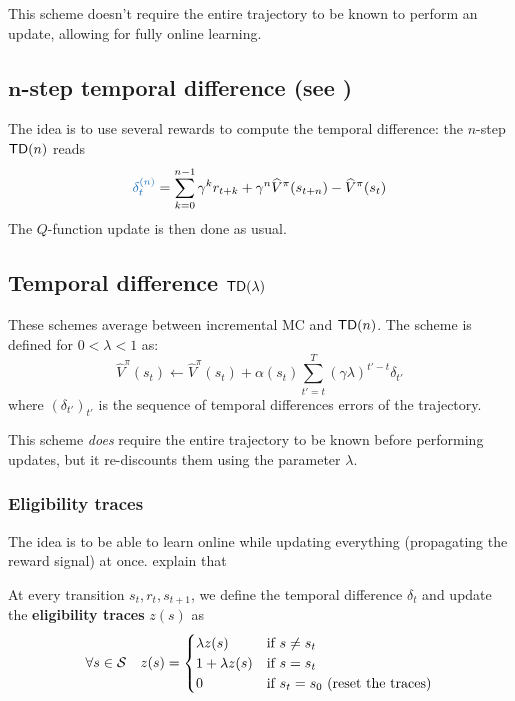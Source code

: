 \documentclass[../course-notes.tex]{subfiles}
\begin{document}
This scheme doesn't require the entire trajectory to be known to perform an update, allowing for fully online learning.


\subsection{$\boldsymbol{n}$-step temporal difference (see \cite[chap.~7]{Sutton1998})}

The idea is to use several rewards to compute the temporal difference: the $n$-step $\mathsf{TD}(n)$ reads
\begin{equation}
	{\bluefont \delta^{(n)}_t} =
	\sum_{k=0}^{n-1} \gamma^k r_{t+k}
	+ \gamma^n \widehat{V}^\pi(s_{t+n}) - \widehat{V}^\pi(s_t)
\end{equation}
The $Q$-function update is then done as usual.



\subsection{Temporal difference $\mathsf{TD}(\lambda)$}

These schemes average between incremental MC and $\mathsf{TD}(n)$. The scheme is defined for $0 < \lambda < 1$ as:
\begin{equation}
	\widehat{V}^\pi(s_t) \leftarrow \widehat{V}^\pi(s_t) + \alpha(s_t) \sum_{t'=t}^T (\gamma\lambda)^{t'-t}\delta_{t'}
\end{equation}
where ${(\delta_{t'})}_{t'}$ is the sequence of temporal differences errors of the trajectory.


This scheme \textit{does} require the entire trajectory to be known before performing updates, but it re-discounts them using the parameter $\lambda$.


\subsubsection{Eligibility traces}

The idea is to be able to learn online while updating everything (propagating the reward signal) at once. \textcite{Sutton1998} explain that 

At every transition $s_t,r_t,s_{t+1}$, we define the temporal difference $\delta_t$ and update the \textbf{\bluefont eligibility traces} {\bluefont $z(s)$} as
\[
	\forall s\in\mathcal{S} \quad 
	z(s) = \begin{cases}
	\lambda z(s) &\text{if }s\neq s_t \\
	1 + \lambda z(s)& \text{if }s=s_t \\
	0& \text{if } s_t = s_0 \text{ (reset the traces)}
	\end{cases}
\]
\end{document}
